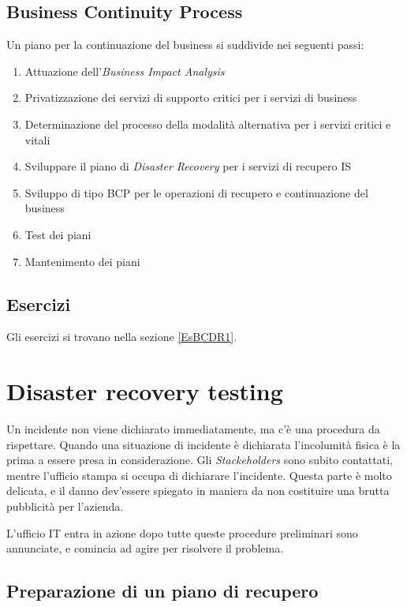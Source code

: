 \subsection{Business Continuity Process}

Un piano per la continuazione del business si suddivide nei seguenti passi:
\begin{enumerate}
  \item Attuazione dell'\textit{Business Impact Analysis}
  \item Privatizzazione dei servizi di supporto critici per i servizi di 
  business
  \item Determinazione del processo della modalità alternativa per i servizi 
  critici e vitali
  \item Sviluppare il piano di \textit{Disaster Recovery} per i servizi di 
  recupero IS
  \item Sviluppo di tipo BCP per le operazioni di recupero e continuazione del 
  business
  \item Test dei piani
  \item Mantenimento dei piani
\end{enumerate}

\subsection{Esercizi}

Gli esercizi si trovano nella sezione \ref{EsBCDR1}.

\section{Disaster recovery testing}

Un incidente non viene dichiarato immediatamente, ma c'è una procedura da 
rispettare. Quando una situazione di incidente è dichiarata l'incolumità fisica 
è la prima a essere presa in considerazione. Gli \textit{Stackeholders} sono 
subito contattati, mentre l'ufficio stampa si occupa di dichiarare l'incidente. 
Questa parte è molto delicata, e il danno dev'essere spiegato in maniera da non 
costituire una brutta pubblicità per l'azienda.

L'ufficio IT entra in azione dopo tutte queste procedure preliminari sono 
annunciate, e comincia ad agire per risolvere il problema.

\subsection{Preparazione di un piano di recupero}


